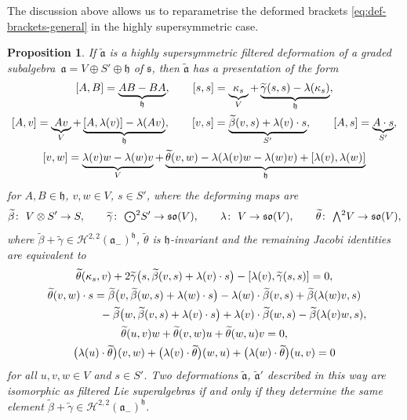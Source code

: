 \documentclass[11pt]{article}
\numberwithin{equation}{section}
\numberwithin{equation}{section}
\newtheorem{Proposition}[Theorem]{Proposition}
 { \theoremstyle{definition}
\newtheorem{Definition}[Theorem]{Definition}
\newtheorem{Note}[Theorem]{Note}
\newtheorem{Example}[Theorem]{Example}
\newtheorem{Remark}[Theorem]{Remark} }
\newcommand{\fa}{\mathfrak{a}}
\newcommand{\fh}{\mathfrak{h}}
\newcommand{\fs}{\mathfrak{s}}
\newcommand{\fso}{\mathfrak{so}}
\newcommand{\cH}{\mathcal{H}}
\newcommand{\betatilde}{\widetilde{\beta}}
\newcommand{\gammatilde}{\widetilde{\gamma}}
\newcommand{\thetatilde}{\widetilde{\theta}}
\newcommand{\fatilde}{\widetilde{\fa}}
\newcommand{\Wedge}{\mathchoice{{\textstyle\bigwedge}}{\bigwedge}{\bigwedge}{\bigwedge}}	%
\newcommand{\Odot}{\mathchoice{{\textstyle\bigodot}}{\bigodot}{\bigodot}{\bigodot}}
\newcommand{\1}{\mathbbm{1}}
\begin{document}
The discussion above allows us to reparametrise the deformed brackets \eqref{eq:def-brackets-general} in the highly supersymmetric case.

\begin{Proposition}\label{prop:filtered-def-high-susy}
	If $\fatilde$ is a highly supersymmetric filtered deformation of a graded subalgebra~${\fa=V\oplus S'\oplus \fh}$ of $\fs$, then $\fatilde$ has a presentation of the form
	\begin{gather}
		\comm{A}{B} = \underbrace{AB-BA}_\fh,\qquad
		\comm{s}{s} = \underbrace{\kappa_s}_V + \underbrace{\gammatilde(s,s) - \lambda(\kappa_s)}_\fh,\nonumber\\
		\comm{A}{v} = \underbrace{Av}_V + \underbrace{\comm{A}{\lambda(v)} - \lambda(Av)}_\fh,\qquad
		\comm{v}{s} = \underbrace{\betatilde(v,s) + \lambda(v)\cdot s}_{S'},\qquad
		\comm{A}{s} = \underbrace{A\cdot s}_{S'},\nonumber
	\\
		\comm{v}{w} = \underbrace{\lambda(v)w-\lambda(w)v}_V + \underbrace{\thetatilde(v,w) - \lambda(\lambda(v)w-\lambda(w)v) + \comm{\lambda(v)}{\lambda(w)}}_\fh\label{eq:def-brackets-V}
	\end{gather}
	for $A,B\in\fh$, $v,w\in V$, $s\in S'$, where the deforming maps are
	\[
\betatilde\colon\ V\otimes S' \to S,\qquad
		\gammatilde\colon\ \Odot^2 S' \to \fso(V),\qquad
		\lambda\colon\ V\to\fso(V),\qquad
		\thetatilde\colon\ \Wedge^2 V \to \fso(V),
	\]
	where $\betatilde+\gammatilde\in\cH^{2,2}(\fa_-)^\fh$, $\thetatilde$ is $\fh$-invariant and the remaining Jacobi identities are equivalent to
	\begin{gather}
		\thetatilde(\kappa_s,v) + 2\gammatilde\bigl(s,\betatilde(v,s)+\lambda(v)\cdot s\bigr) - \comm{\lambda(v)}{\gammatilde(s,s)} = 0, \label{eq:tilde-theta-kappa}\\
		\thetatilde(v,w)\cdot s
		= \betatilde\bigl(v,\betatilde(w,s)+\lambda(w)\cdot s\bigr)
			- \lambda(w)\cdot \betatilde(v,s) + \betatilde(\lambda(w)v,s)\nonumber\\
			\phantom{\thetatilde(v,w)\cdot s
		=}{} - \betatilde\bigl(w,\betatilde(v,s)+\lambda(v)\cdot s\bigr)
			+ \lambda(v)\cdot \betatilde(w,s) - \betatilde(\lambda(v)w,s),\label{eq:tilde-theta-lambda}\\
		\thetatilde(u,v)w + \thetatilde(v,w)u + \thetatilde(w,u)v =0,\label{eq:tilde-theta-bianchi}\\
		\bigl(\lambda(u)\cdot\thetatilde\bigr)(v,w) + \bigl(\lambda(v)\cdot\thetatilde\bigr)(w,u) +			\bigl(\lambda(w)\cdot\thetatilde\bigr)(u,v) = 0 \label{eq:tilde-theta-lambda-bianchi}
	\end{gather}
	for all $u,v,w\in V$ and $s\in S'$.
	Two deformations $\fatilde$, $\fatilde'$ described in this way are isomorphic as filtered Lie superalgebras if and only if they determine the same element $\betatilde+\gammatilde\in\cH^{2,2}(\fa_-)^\fh$.
\end{Proposition}
\end{document}
